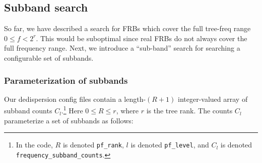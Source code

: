 \documentclass{article}
\numberwithin{equation}{section}   %
\begin{document}
\subsection{Subband search}
\label{sec:subband_search}

So far, we have described a search for FRBs which cover the full tree-freq range $0 \le f < 2^r$.
This would be suboptimal since real FRBs do not always cover the full frequency range.
Next, we introduce a ``sub-band'' search for searching a configurable set of subbands.

\subsubsection{Parameterization of subbands}

Our dedispersion config files contain a length-$(R+1)$ integer-valued array of subband counts $C_l$.\footnote{In 
the code, $R$ is denoted {\tt pf\_rank}, $l$ is denoted {\tt pf\_level}, and $C_l$ is denoted {\tt frequency\_subband\_counts}.}
Here $0 \le R \le r$, where $r$ is the tree rank.
The counts $C_l$ parameterize a set of subbands as follows:
\end{document}
